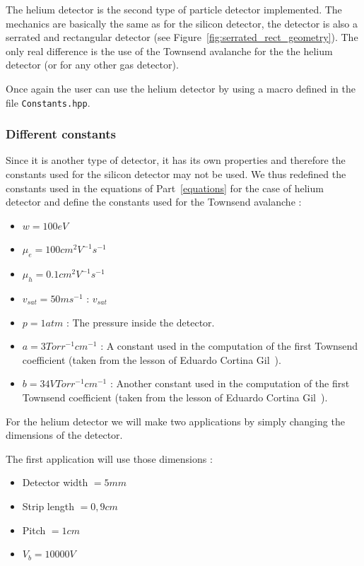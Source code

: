 \documentclass[11pt]{article}
\begin{document}
			The helium detector is the second type of particle detector implemented. The mechanics are basically
			the same as for the silicon detector, the detector is also a serrated and rectangular detector
			(see Figure~\ref{fig:serrated_rect_geometry}). The only real difference is the use of the Townsend
			avalanche for the the helium detector (or for any other gas detector).

			Once again the user can use the helium detector by using a macro defined in the file
			\texttt{Constants.hpp}.

			\subsubsection*{Different constants}

				Since it is another type of detector, it has its own properties and therefore the constants
				used for the silicon detector may not be used. We thus redefined the constants used in the
				equations of Part~\ref{equations} for the case of helium detector and define the constants
				used for the Townsend avalanche :

				\begin{itemize}

					\item $w = 100 eV$
					\item $\mu_e = 100 cm^2V^{-1}s^{-1}$
					\item $\mu_h = 0.1 cm^2V^{-1}s^{-1}$
					\item $v_{sat} = 50 ms^{-1}$ : $v_{sat}$
					\item $p = 1 atm$ : The pressure inside the detector.
					\item $a = 3 Torr^{-1}cm^{-1}$ : A constant used in the computation of the first
						Townsend coefficient (taken from the lesson of Eduardo Cortina Gil~\cite{lphy2236}).
					\item $b = 34 VTorr^{-1}cm^{-1}$ : Another constant used in the computation of the
						first Townsend coefficient (taken from the lesson of Eduardo Cortina Gil~\cite{lphy2236}).

				\end{itemize}

				For the helium detector we will make two applications by simply changing the dimensions of
				the detector.

				The first application will use those dimensions :
				\begin{itemize}

					\item Detector width $= 5 mm$
					\item Strip length $= 0,9 cm$
					\item Pitch $= 1 cm$
					\item $V_b = 10000 V$

				\end{itemize}
\end{document}
